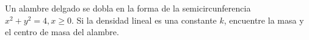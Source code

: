 \item Un alambre delgado se dobla en la forma de la semicircunferencia $x^2 + y^2 = 4, x \ge 0$. Si la densidad lineal es una constante $k$, encuentre la masa y el centro de masa del alambre.
